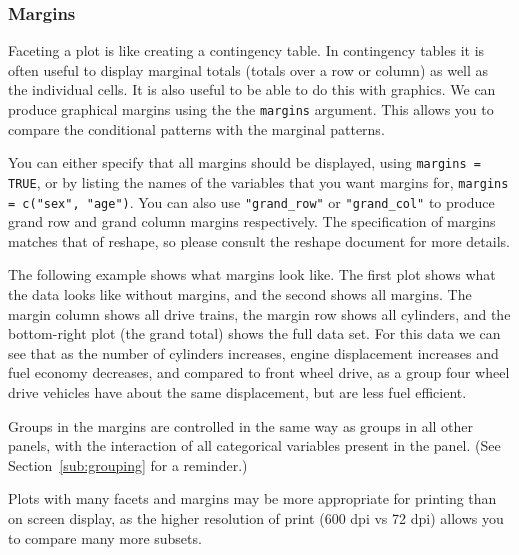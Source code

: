 \subsubsection{Margins}\label{sub:margins}

Faceting a plot is like creating a contingency table.  In contingency tables it is often useful to display marginal totals (totals over a row or column) as well as the individual cells.  It is also useful to be able to do this with graphics.  We can produce graphical margins using the the {\tt margins} argument.  This allows you to compare the conditional patterns with the marginal patterns.

You can either specify that all margins should be displayed, using {\tt margins = TRUE}, or by listing the names of the variables that you want margins for, {\tt margins = c("sex", "age")}.  You can also use \verb|"grand_row"| or \verb|"grand_col"| to produce grand row and grand column margins respectively.  The specification of margins matches that of reshape, so please consult the reshape document for more details.

The following example shows what margins look like.  The first plot shows what the data looks like without margins, and the second shows all margins.  The margin column shows all drive trains, the margin row shows all cylinders, and the bottom-right plot (the grand total) shows the full data set.  For this data we can see that as the number of cylinders increases, engine displacement increases and fuel economy decreases, and compared to front wheel drive, as a group four wheel drive vehicles have about the same displacement, but are less fuel efficient.

% 


Groups in the margins are controlled in the same way as groups in all other panels, with the interaction of all categorical variables present in the panel.  (See Section~\ref{sub:grouping} for a reminder.)

% 


Plots with many facets and margins may be more appropriate for printing than on screen display, as the higher resolution of print (600 dpi vs 72 dpi) allows you to compare many more subsets.

